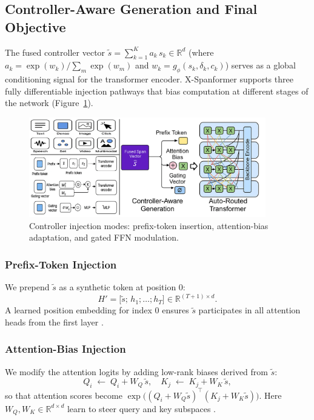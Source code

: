 \subsection{Controller-Aware Generation and Final Objective}
\label{sec:controller-injection}

The fused controller vector 
\(\displaystyle \tilde{s} = \sum_{k=1}^K a_k\,s_k\in\mathbb{R}^d\) 
(where \(a_k=\exp(w_k)/\sum_{m}\exp(w_m)\) and \(w_k=g_\phi(s_k,\delta_k,c_k)\)) serves as a global conditioning signal for the transformer encoder.  X-Spanformer supports three fully differentiable injection pathways that bias computation at different stages of the network (Figure~\ref{fig:controller_injection_modes}).

\begin{figure}[H]
	\centering
	\includegraphics[width=0.92\textwidth]{figures/figure_5.png}
	\caption{Controller injection modes: prefix-token insertion, attention-bias adaptation, and gated FFN modulation.}
	\label{fig:controller_injection_modes}
\end{figure}

\subsubsection{Prefix-Token Injection}
We prepend \(\tilde{s}\) as a synthetic token at position 0:
\[
H' = \bigl[\tilde{s};\,h_1;\dots;h_T\bigr]\in\mathbb{R}^{(T+1)\times d}.
\]
A learned position embedding for index 0 ensures \(\tilde{s}\) participates in all attention heads from the first layer \cite{li2021prefix}. 

\subsubsection{Attention-Bias Injection}
We modify the attention logits by adding low-rank biases derived from \(\tilde{s}\):
\[
Q_i \;\leftarrow\; Q_i + W_Q\,\tilde{s},
\quad
K_j \;\leftarrow\; K_j + W_K\,\tilde{s},
\]
so that attention scores become 
\(\exp\bigl((Q_i + W_Q\tilde{s})^\top(K_j + W_K\tilde{s})\bigr)\).  
Here \(W_Q,W_K\in\mathbb{R}^{d\times d}\) learn to steer query and key subspaces \cite{hu2021lora}.  

